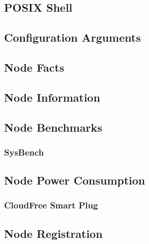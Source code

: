 \subsection{POSIX Shell}
\label{subsec:implementation_installer_posix_shell}

\subsection{Configuration Arguments}
\label{subsec:implementation_installer_configuration_arguments}

\subsection{Node Facts}
\label{subsec:implementation_installer_node_facts}

\subsection{Node Information}
\label{subsec:implementation_installer_node_information}

\subsection{Node Benchmarks}
\label{subsec:implementation_installer_node_benchmarks}

\subsubsection{SysBench}
\label{subsubsec:implementation_installer_node_benchmarks_sysbench}

\subsection{Node Power Consumption}
\label{subsec:implementation_installer_node_power_consumption}

\subsubsection{CloudFree Smart Plug}
\label{subsubsec:implementation_installer_node_power_consumption_cloudfree_smart_plug}

\subsection{Node Registration}
\label{subsec:implementation_installer_node_registration}

